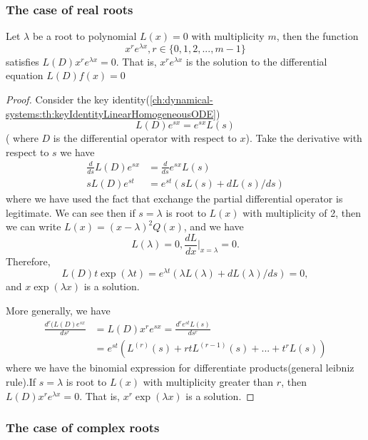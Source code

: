 \begin{refsection}
\subsubsection{The case of real roots}
\begin{theorem}\cite[49]{sanchez1968ordinary}
Let $\lambda$ be a root to polynomial $L(x) = 0$ with multiplicity $m$, then the function 
$$x^re^{\lambda x}, r\in \{0,1,2,...,m-1\}$$
satisfies
$L(D)x^re^{\lambda x} = 0$.
That is, $x^re^{\lambda x}$ is the solution to the differential equation $L(D)f(x) = 0$
\end{theorem}
\begin{proof}
Consider the key identity(\autoref{ch:dynamical-systems:th:keyIdentityLinearHomogeneousODE}) $$ L(D)e^{sx} = e^{sx}L(s)$$( where $D$ is the differential operator with respect to $x$). Take the derivative with respect to $s$ we have
\begin{align*}
    \frac{d}{ds}L(D)e^{sx} &= \frac{d}{ds}e^{sx}L(s) \\
    sL(D)e^{st} &= e^{st}(sL(s) + dL(s)/ds)
\end{align*}
where we have used the fact that exchange the partial differential operator is legitimate. 
We can see then if $s=\lambda$ is root to $L(x)$ with multiplicity of 2, then we can write $L(x)=(x-\lambda)^2Q(x)$, and we have $$L(\lambda) = 0, \frac{dL}{dx}|_{x=\lambda} = 0.$$
Therefore, 
$$L(D)t\exp(\lambda t) = e^{\lambda t}(\lambda L(\lambda) + dL(\lambda)/ds) = 0,$$
and $x\exp(\lambda x)$ is a solution. 

More generally, we have
\begin{align*}
   \frac{d^r(L(D)e^{sx}}{ds^r} &= L(D)x^re^{sx} =  \frac{d^r e^{st}L(s)}{ds^r} \\
    &= e^{st}(L^{(r)}(s) + rtL^{(r-1)}(s) + ... + t^rL(s))
\end{align*}
where we have the binomial expression for differentiate products(general leibniz rule).If $s=\lambda$ is root to $L(x)$ with multiplicity greater than $r$, then
$L(D)x^re^{\lambda x} = 0$.
That is, $x^r\exp(\lambda x)$ is a solution.
\end{proof}

\subsubsection{The case of complex roots}


\end{refsection}
